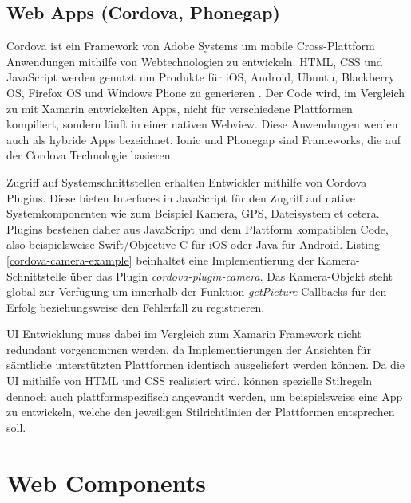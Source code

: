 \newpage


\subsection{Web Apps (Cordova, Phonegap)}

Cordova ist ein Framework von Adobe Systems um mobile Cross-Plattform Anwendungen mithilfe von Webtechnologien zu entwickeln.
\ac{HTML}, \ac{CSS} und JavaScript werden genutzt um Produkte für iOS, Android, Ubuntu, Blackberry OS, Firefox OS und Windows Phone zu generieren \cite{Cordo26:online}.
Der Code wird, im Vergleich zu mit Xamarin entwickelten Apps, nicht für verschiedene Plattformen kompiliert,
sondern läuft in einer nativen Webview. Diese Anwendungen werden auch als hybride Apps bezeichnet.
Ionic und Phonegap sind Frameworks, die auf der Cordova Technologie basieren.

Zugriff auf Systemschnittstellen erhalten Entwickler mithilfe von Cordova Plugins. Diese bieten
Interfaces in JavaScript für den Zugriff auf native Systemkomponenten wie zum Beispiel Kamera, GPS, Dateisystem et cetera.
Plugins bestehen daher aus JavaScript und dem Plattform kompatiblen Code,
also beispielsweise Swift/Objective-C für iOS oder Java für Android.
Listing \ref{cordova-camera-example} beinhaltet eine Implementierung der Kamera-Schnittstelle über das Plugin \emph{cordova-plugin-camera}.
Das Kamera-Objekt steht global zur Verfügung um innerhalb der Funktion \emph{getPicture} Callbacks für den Erfolg beziehungsweise den Fehlerfall zu registrieren.

\ac{UI} Entwicklung muss dabei im Vergleich zum Xamarin Framework nicht redundant vorgenommen werden, da Implementierungen der
Ansichten für sämtliche unterstützten Plattformen identisch ausgeliefert werden können.
Da die \ac{UI} mithilfe von \ac{HTML} und \ac{CSS} realisiert wird,
können spezielle Stilregeln dennoch auch plattformspezifisch angewandt werden, um beispielsweise eine App zu entwickeln,
welche den jeweiligen Stilrichtlinien der Plattformen entsprechen soll.

\vspace{0.3cm}

\vspace{0.3cm}

\newpage
\section{Web Components}
\label{sec:webcomponents}


